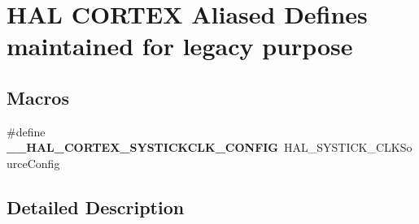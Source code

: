 \hypertarget{group___h_a_l___c_o_r_t_e_x___aliased___defines}{}\section{H\+AL C\+O\+R\+T\+EX Aliased Defines maintained for legacy purpose}
\label{group___h_a_l___c_o_r_t_e_x___aliased___defines}
\subsection*{Macros}
\begin{DoxyCompactItemize}
\item 
\mbox{\label{group___h_a_l___c_o_r_t_e_x___aliased___defines_gac1aca630ce4888aa3febf24db3d9ce45}} 
\#define {\bfseries \+\_\+\+\_\+\+H\+A\+L\+\_\+\+C\+O\+R\+T\+E\+X\+\_\+\+S\+Y\+S\+T\+I\+C\+K\+C\+L\+K\+\_\+\+C\+O\+N\+F\+IG}~H\+A\+L\+\_\+\+S\+Y\+S\+T\+I\+C\+K\+\_\+\+C\+L\+K\+Source\+Config
\end{DoxyCompactItemize}


\subsection{Detailed Description}
